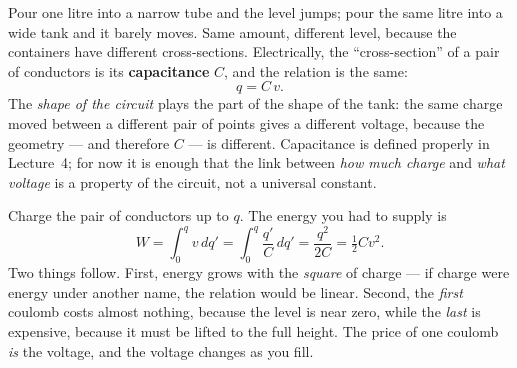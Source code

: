 \documentclass[11pt,a4paper]{article}
\begin{document}
\begin{center}
\end{center}

Pour one litre into a narrow tube and the level jumps; pour the same litre into a wide
tank and it barely moves. Same amount, different level, because the containers have
different cross-sections. Electrically, the ``cross-section'' of a pair of conductors is
its \textbf{capacitance} $C$, and the relation is the same:
\[
  q = C\,v .
\]
The \emph{shape of the circuit} plays the part of the shape of the tank: the same charge
moved between a different pair of points gives a different voltage, because the geometry
--- and therefore $C$ --- is different. Capacitance is defined properly in Lecture~4; for
now it is enough that the link between \emph{how much charge} and \emph{what voltage} is a
property of the circuit, not a universal constant.

\begin{ideabox}
Charge the pair of conductors up to $q$. The energy you had to supply is
\[
  W = \int_0^{q} v\,dq' = \int_0^{q} \frac{q'}{C}\,dq' = \frac{q^2}{2C} = \tfrac{1}{2}Cv^2 .
\]
Two things follow. First, energy grows with the \emph{square} of charge --- if charge
were energy under another name, the relation would be linear. Second, the \emph{first}
coulomb costs almost nothing, because the level is near zero, while the \emph{last} is
expensive, because it must be lifted to the full height. The price of one coulomb
\emph{is} the voltage, and the voltage changes as you fill.
\end{ideabox}
\end{document}
